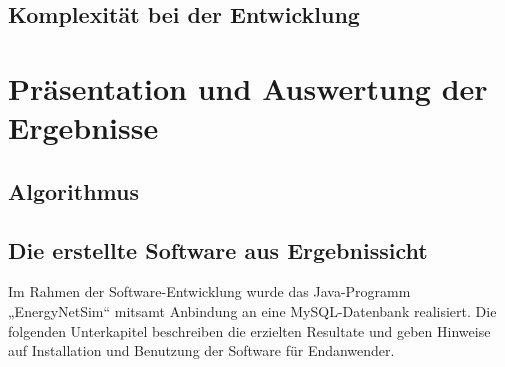 \documentclass[12pt,titlepage]{article}
\begin{document}
\subsection{Komplexität bei der Entwicklung}

\section{Präsentation und Auswertung der Ergebnisse} \label{Ergebnisse}
\subsection{Algorithmus} \label{subsec:ErgAlg}


\subsection{Die erstellte Software aus Ergebnissicht}
Im Rahmen der Software-Entwicklung wurde das Java-Programm „EnergyNetSim“ mitsamt Anbindung an eine MySQL-Datenbank realisiert. Die folgenden Unterkapitel beschreiben die erzielten Resultate und geben Hinweise auf Installation und Benutzung der Software für Endanwender.
\end{document}
